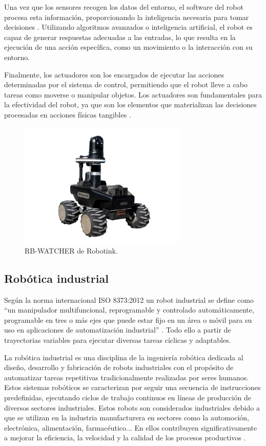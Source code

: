 Una vez que los sensores recogen los datos del entorno, el software del robot procesa esta información, proporcionando la inteligencia necesaria para tomar decisiones \cite{definicion_robot_2}. Utilizando algoritmos avanzados o inteligencia artificial, el robot es capaz de generar respuestas adecuadas a las entradas, lo que resulta en la ejecución de una acción específica, como un movimiento o la interacción con su entorno. 

Finalmente, los actuadores son los encargados de ejecutar las acciones determinadas por el sistema de control, permitiendo que el robot lleve a cabo tareas como moverse o manipular objetos. Los actuadores son fundamentales para la efectividad del robot, ya que son los elementos que materializan las decisiones procesadas en acciones físicas tangibles \cite{definicion_robot_2}. 

\begin{figure} [h!]
  \begin{center}
    \includegraphics[width=8cm]{figs/Robot_intro}
  \end{center}
  \caption{\centering RB-WATCHER de Robotink.}
  \label{fig:Robot_intro}
\end{figure}

\subsection{Robótica industrial}

Según la norma internacional ISO 8373:2012 un robot industrial se define como ``un manipulador multifuncional, reprogramable y controlado automáticamente, programable en tres o más ejes que puede estar fijo en un área o móvil para su uso en aplicaciones de automatización industrial'' \cite{definicion_iso}. Todo ello a partir de trayectorias variables para ejecutar diversas tareas cíclicas y adaptables. 

La robótica industrial es una disciplina de la ingeniería robótica dedicada al diseño, desarrollo y fabricación de robots industriales con el propósito de automatizar tareas repetitivas tradicionalmente realizadas por seres humanos. Estos sistemas robóticos se caracterizan por seguir una secuencia de instrucciones predefinidas, ejecutando ciclos de trabajo continuos en líneas de producción de diversos sectores industriales. Estos robots son considerados industriales debido a que se utilizan en la industria manufacturera en sectores como la automoción, electrónica, alimentación, farmacéutico... En ellos contribuyen significativamente a mejorar la eficiencia, la velocidad y la calidad de los procesos productivos \cite{info_robotica_industrial_1}. 

